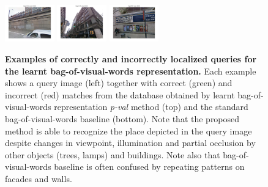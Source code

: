 \begin{figure}[h]
\begin{minipage}{0.75\linewidth}
\begin{minipage}{\linewidth}
                \colorbox{myRed}{\includegraphics[trim = 35mm 30mm 35mm 30mm, clip=true, height=16mm]{imgs/Pval/exMix19/mix02.jpg}}
                \colorbox{myGreen}{\includegraphics[trim = 35mm 30mm 35mm 30mm, clip=true, height=16mm]{imgs/Pval/exMix19/mix03.jpg}}
                \colorbox{myRed}{\includegraphics[trim = 35mm 30mm 35mm 30mm, clip=true, height=16mm]{imgs/Pval/exMix19/mix04.jpg}}
            \end{minipage} 
        \end{minipage}
      \caption{
          \textbf{Examples  of correctly and incorrectly localized queries for the learnt bag-of-visual-words representation.}
          Each example shows a query image (left) together with correct (green) and incorrect (red) matches from the database obtained by learnt bag-of-visual-words representation \emph{p-val} method (top) and the standard bag-of-visual-words baseline (bottom). Note that the proposed method is able to recognize the place depicted in the query image despite changes in viewpoint, illumination and partial occlusion by other objects (trees, lamps) and buildings. Note also that bag-of-visual-words baseline is often confused by repeating patterns on facades and walls. 
      }
      \label{fig:images}
    \end{figure}
%
